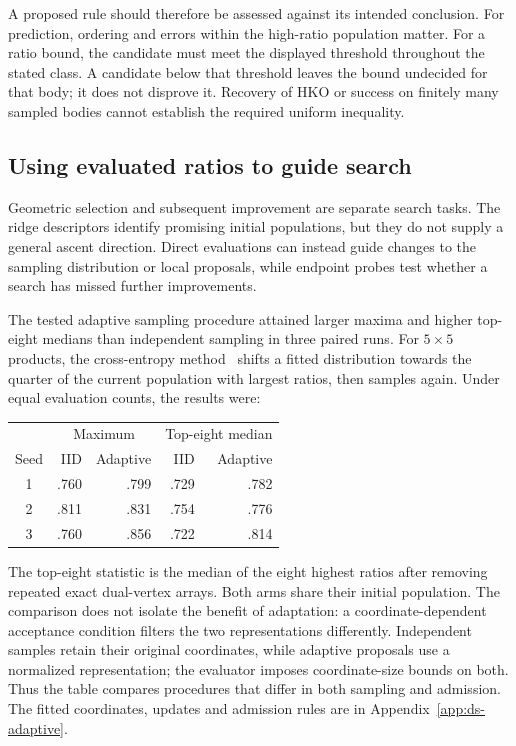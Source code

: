 A proposed rule should therefore be assessed against its intended conclusion.
For prediction, ordering and errors within the high-ratio population matter.
For a ratio bound, the candidate must meet the displayed threshold throughout
the stated class. A candidate below that threshold leaves the bound undecided
for that body; it does not disprove it. Recovery of HKO or success on finitely
many sampled bodies cannot establish the required uniform inequality.

\subsection{Using evaluated ratios to guide search}

Geometric selection and subsequent improvement are separate search tasks.
The ridge descriptors identify promising initial populations, but they do
not supply a general ascent direction. Direct evaluations can instead
guide changes to the sampling distribution or local proposals, while
endpoint probes test whether a search has missed further improvements.

The tested adaptive sampling procedure attained larger maxima and
higher top-eight medians than independent sampling in three paired runs.
For $5\times5$ products, the cross-entropy method~\cite{dsDeBoer2005}
shifts a fitted distribution towards the quarter of the current population
with largest ratios, then samples again. Under equal evaluation counts,
the results were:
\begin{center}
\begin{tabular}{crrrr}
\hline
 & \multicolumn{2}{c}{Maximum} & \multicolumn{2}{c}{Top-eight median}\\
Seed & IID & Adaptive & IID & Adaptive\\
\hline
1 & .760 & .799 & .729 & .782\\
2 & .811 & .831 & .754 & .776\\
3 & .760 & .856 & .722 & .814\\
\hline
\end{tabular}
\end{center}
The top-eight statistic is the median of the eight highest ratios after
removing repeated exact dual-vertex arrays. Both arms share their initial
population. The comparison does not isolate the benefit of adaptation:
a coordinate-dependent acceptance condition filters the two
representations differently. Independent samples retain their original
coordinates, while adaptive proposals use a normalized representation;
the evaluator imposes coordinate-size bounds on both. Thus the table
compares procedures that differ in both sampling and admission. The
fitted coordinates, updates and admission rules are in
Appendix~\ref{app:ds-adaptive}.

